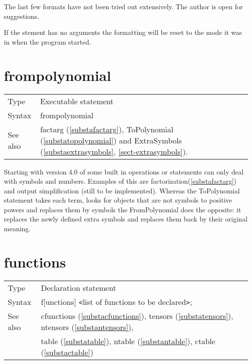 
\noindent The last few formats have not been tried out extensively. The 
author is open for suggestions. \vspace{10mm}


\noindent If the stement has no arguments the formatting will be reset to 
the mode it was in when the program started.


\section{frompolynomial}
\label{substafrompolynomial}

\noindent \begin{tabular}{ll}
Type & Executable statement\\
Syntax & frompolynomial
\\ See also & factarg (\ref{substafactarg}), ToPolynomial 
(\ref{substatopolynomial}) and ExtraSymbols (\ref{substaextrasymbols},
\ref{sect-extrasymbols}).
\end{tabular} \vspace{4mm}

\noindent Starting with version 4.0 of \FORM{} some built in operations or
statements can only deal with symbols and numbers. Examples of this are 
factorization(\ref{substafactarg}) and output simplification (still to be 
implemented). Whereas the ToPolynomial statement takes each term, looks for objects 
that are not symbols to positive powers and replaces them by symbols the 
FromPolynomial does the opposite: it replaces the newly defined extra 
symbols and replaces them back by their original meaning.
\vspace{10mm}

 
\section{functions}
\label{substafunctions}

\noindent \begin{tabular}{ll}
Type & Declaration statement\\
Syntax & f[unctions] {\tt<}list of functions to be declared{\tt>}; \\
See also & cfunctions (\ref{substacfunctions}), 
           tensors (\ref{substatensors}),
           ntensors (\ref{substantensors}), \\ &
           table (\ref{substatable}),
           ntable (\ref{substantable}),
           ctable (\ref{substactable})
\end{tabular} \vspace{4mm}

